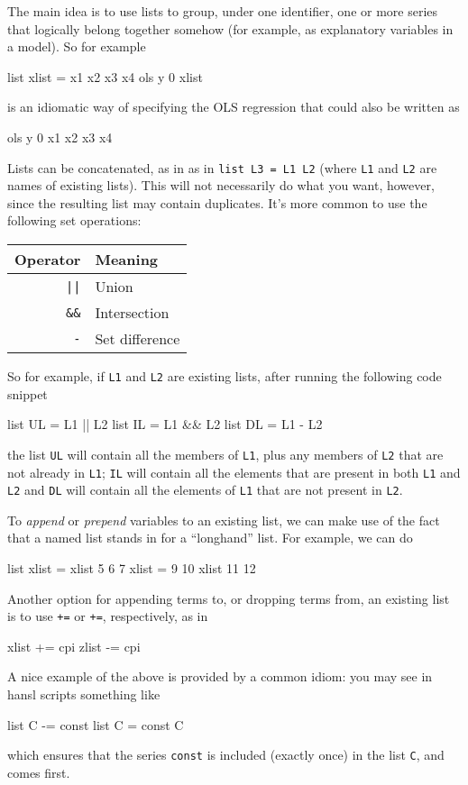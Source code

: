 The main idea is to use lists to group, under one identifier, one or
more series that logically belong together somehow (for example, as
explanatory variables in a model). So for example
\begin{code}
list xlist = x1 x2 x3 x4
ols y 0 xlist
\end{code}
is an idiomatic way of specifying the OLS regression that could also
be written as
\begin{code}
ols y 0 x1 x2 x3 x4
\end{code}

Lists can be concatenated, as in as in \texttt{list L3 = L1 L2} (where
\texttt{L1} and \texttt{L2} are names of existing lists). This will
not necessarily do what you want, however, since the resulting list
may contain duplicates. It's more common to use the following set
operations:

\begin{center}
  \begin{tabular}{rl}
    \textbf{Operator} & \textbf{Meaning} \\
    \hline
    \verb,||, & Union \\
    \verb|&&| & Intersection \\
    \verb|-|  & Set difference \\
    \hline
  \end{tabular}
\end{center}

So for example, if \texttt{L1} and \texttt{L2} are existing lists,
after running the following code snippet
\begin{code}
  list UL = L1 || L2 
  list IL = L1 && L2
  list DL = L1 - L2
\end{code}
the list \texttt{UL} will contain all the members of \texttt{L1}, plus
any members of \texttt{L2} that are not already in \texttt{L1};
\texttt{IL} will contain all the elements that are present in both
\texttt{L1} and \texttt{L2} and \texttt{DL} will contain all the
elements of \texttt{L1} that are not present in \texttt{L2}. 

To \textit{append} or \textit{prepend} variables to an existing list,
we can make use of the fact that a named list stands in for a
``longhand'' list.  For example, we can do
%
\begin{code}
list xlist = xlist 5 6 7
xlist = 9 10 xlist 11 12
\end{code}
 
Another option for appending terms to, or dropping terms from, an
existing list is to use \texttt{+=} or \texttt{+=}, respectively, as
in
\begin{code}
xlist += cpi
zlist -= cpi
\end{code}
A nice example of the above is provided by a common idiom: you may
see in hansl scripts something like
\begin{code}
  list C -= const
  list C = const C
\end{code}
which ensures that the series \texttt{const} is included (exactly
once) in the list \texttt{C}, and comes first.

